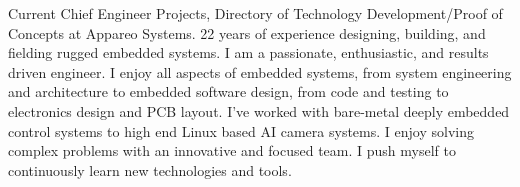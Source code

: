 

\begin{cvparagraph}

Current Chief Engineer Projects, Directory of Technology Development/Proof of Concepts at Appareo Systems. 22 years of experience designing, building, and fielding rugged embedded systems. I am a passionate, enthusiastic, and results driven engineer.
I enjoy all aspects of embedded systems, from system engineering and architecture to embedded software design, from code and testing to electronics design and PCB layout. I've worked with bare-metal deeply embedded control systems to high end Linux based AI camera systems. I enjoy solving complex problems with an innovative and focused team. I push myself to continuously learn new technologies and tools.
\end{cvparagraph}
